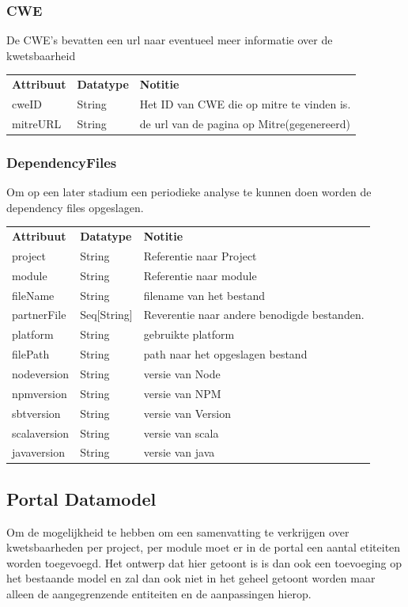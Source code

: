 \subsubsection{CWE}\label{subsubsec:cwe}
De CWE's bevatten een url naar eventueel meer informatie over de kwetsbaarheid

\begin{tabular}{lll}
    \textbf{Attribuut} & \textbf{Datatype} & \textbf{Notitie}\\
    cweID & String & Het ID van CWE die op mitre te vinden is.\\
    mitreURL & String & de url van de pagina op Mitre(gegenereerd)\\
\end{tabular}

\subsubsection{DependencyFiles}\label{subsubsec:dependencyFiles}
Om op een later stadium een periodieke analyse te kunnen doen worden de dependency files opgeslagen.

\begin{tabular}{lll}
    \textbf{Attribuut} & \textbf{Datatype} & \textbf{Notitie}\\
    project & String & Referentie naar Project\\
    module & String & Referentie naar module \\
    fileName & String & filename van het bestand \\
    partnerFile & Seq[String] & Reverentie naar andere benodigde bestanden.\\
    platform & String & gebruikte platform \\
    filePath & String & path naar het opgeslagen bestand \\ %
    nodeversion & String & versie van Node  \\
    npmversion & String & versie van NPM  \\
    sbtversion & String & versie van Version  \\
    scalaversion & String & versie van scala  \\
    javaversion & String & versie van java \\
\end{tabular}

\subsection{Portal Datamodel}\label{subsec:portal-datamodel}
Om de mogelijkheid te hebben om een samenvatting te verkrijgen over kwetsbaarheden per project, per module moet er in de portal een aantal etiteiten worden toegevoegd. Het ontwerp dat hier getoont is is dan ook een toevoeging op het bestaande model en zal dan ook niet in het geheel getoont worden maar alleen de aangegrenzende entiteiten en de aanpassingen hierop.

